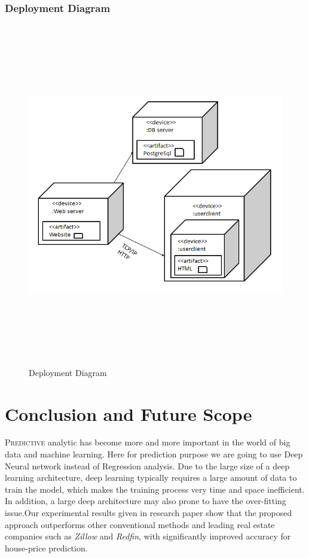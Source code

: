 \documentclass[11pt,fleqn]{book} %
\begin{document}
\subsection{Deployment Diagram}
 \begin{center}
	\begin{figure}[!htbp]
		\centering
		\includegraphics[width=15cm,height=15cm]{Pictures/Deployment.png}
	  \caption{Deployment Diagram}
	  \label{fig:seq1-dig}
	\end{figure}
\end{center}




\chapter{Conclusion and Future Scope}
\lettrine[lines=2]{\color{ocre} P}{redictive} analytic has become more and more important in the world of big data and machine learning. Here for prediction purpose we are going to use Deep Neural network instead of Regression analysis. Due to the large size of a deep learning architecture, deep learning typically requires a large amount of data to train the model, which makes the training process very time and space inefficient. In addition, a large deep architecture may also prone to have the over-fitting issue.Our experimental results given in research paper show that the proposed approach outperforms other conventional methods and leading real estate companies such as \emph{Zillow} and \emph{Redfin}, with significantly improved accuracy for house-price prediction.
\end{document}
